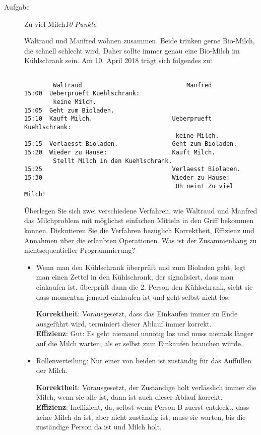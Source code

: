 \documentclass[a4paper,twoside,12pt]{article}
\newcounter{AUFGNR}
\newcommand{\AUFGABE}[2]{\vspace{0.3cm}\item[Aufgabe~\arabic{AUFGNR}]\stepcounter{AUFGNR} #1\hfill\emph{#2}}
\begin{document}
\begin{description}
\AUFGABE{Zu viel Milch}{10 Punkte}

Waltraud und Manfred wohnen zusammen.
Beide trinken gerne Bio-Milch, die schnell schlecht wird.
Daher sollte immer genau eine Bio-Milch im K\"uhlschrank sein.
Am 10. April 2018 tr\"agt sich folgendes zu:
\begin{verbatim}

        Waltraud	                         Manfred
15:00  Ueberprueft Kuehlschrank:
        keine Milch.
15:05  Geht zum Bioladen.
15:10  Kauft Milch.                      Ueberprueft Kuehlschrank:
                                          keine Milch.
15:15  Verlaesst Bioladen.               Geht zum Bioladen.
15:20  Wieder zu Hause:                  Kauft Milch.
        Stellt Milch in den Kuehlschrank.
15:25                                    Verlaesst Bioladen.
15:30                                    Wieder zu Hause:
                                          Oh nein! Zu viel Milch!
\end{verbatim}

\"Uberlegen Sie sich zwei verschiedene Verfahren, wie Waltraud
und Manfred das Milchproblem mit m\"oglichst einfachen Mitteln
in den Griff bekommen k\"onnen.
Diskutieren Sie die Verfahren bez\"uglich Korrektheit, Effizienz
und Annahmen \"uber die erlaubten Operationen.
Was ist der Zusammenhang zu nichtsequentieller Programmierung?

\begin{itemize}
  \item Wenn man den K\"uhlschrank \"uberpr\"uft und zum Bioladen geht, legt
    man einen Zettel in den K\"uhlschrank, der signalisiert, dass
    man einkaufen ist. \"uberpr\"uft dann die 2. Person den K\"uhlschrank,
    sieht sie dass momentan jemand einkaufen ist und geht selbst nicht
    los.

    \textbf{Korrektheit}: Vorausgesetzt, dass das Einkaufen immer zu Ende ausgeführt wird,
    terminiert dieser Ablauf immer korrekt.\\
    \textbf{Effizienz}: Gut: Es geht niemand unn\"otig los und muss niemals l\"anger auf die Milch
    warten, als er selbst zum Einkaufen brauchen würde.
  \item Rollenverteilung: Nur einer von beiden ist zust\"andig f\"ur das Auff\"ullen
  der Milch.

    \textbf{Korrektheit}: Vorausgesetzt, der Zust\"andige holt verl\"asslich immer die Milch,
    wenn sie alle ist, dann ist auch dieser Ablauf korrekt.\\
    \textbf{Effizienz}: Ineffizient, da, selbst wenn Person B zuerst entdeckt, dass keine
    Milch da ist, aber nicht zust\"andig ist, muss sie warten, bis die zust\"andige Person da ist
    und Milch holt.
\end{itemize}


\end{description}
\end{document}
